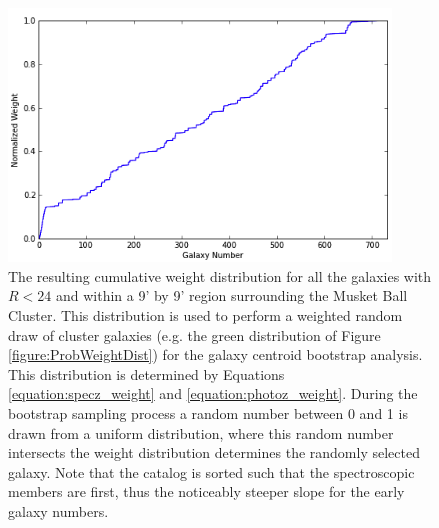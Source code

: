 \begin{figure}
\centering
\includegraphics[width=4in]{Chapter4/AnalysisFiles/cumnormwghtdist.png}
\caption[Probabilistic scheme; cumulative normalized weight distribution for galaxies being in the Musket Ball Cluster.]{
The resulting cumulative weight distribution for all the galaxies with $R<24$ and within a 9' by 9' region surrounding the Musket Ball Cluster.
This distribution is used to perform a weighted random draw of cluster galaxies (e.g. the green distribution of Figure \ref{figure:ProbWeightDist}) for the galaxy centroid bootstrap analysis.
This distribution is determined by Equations \ref{equation:specz_weight} and \ref{equation:photoz_weight}.
During the bootstrap sampling process a random number between 0 and 1 is drawn from a uniform distribution, where this random number intersects the weight distribution determines the randomly selected galaxy.
Note that the catalog is sorted such that the spectroscopic members are first, thus the noticeably steeper slope for the early galaxy numbers.
}
\label{figure:NormWeightDist}
\end{figure}

